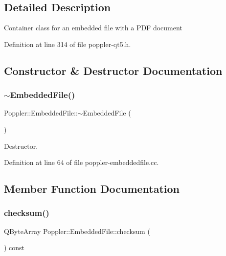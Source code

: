 \subsection{Detailed Description}
Container class for an embedded file with a P\+DF document 

Definition at line 314 of file poppler-\/qt5.\+h.



\subsection{Constructor \& Destructor Documentation}
\mbox{\label{class_poppler_1_1_embedded_file_a693ebe5a8adf7ac0209e850d21a17040}} 
\subsubsection{\texorpdfstring{$\sim$\+Embedded\+File()}{~EmbeddedFile()}}
{\footnotesize\ttfamily Poppler\+::\+Embedded\+File\+::$\sim$\+Embedded\+File (\begin{DoxyParamCaption}{ }\end{DoxyParamCaption})}

Destructor. 

Definition at line 64 of file poppler-\/embeddedfile.\+cc.



\subsection{Member Function Documentation}
\mbox{\label{class_poppler_1_1_embedded_file_a9a370ff9c3d1946f040b4fd78a89274e}} 
\subsubsection{\texorpdfstring{checksum()}{checksum()}}
{\footnotesize\ttfamily Q\+Byte\+Array Poppler\+::\+Embedded\+File\+::checksum (\begin{DoxyParamCaption}{ }\end{DoxyParamCaption}) const}

